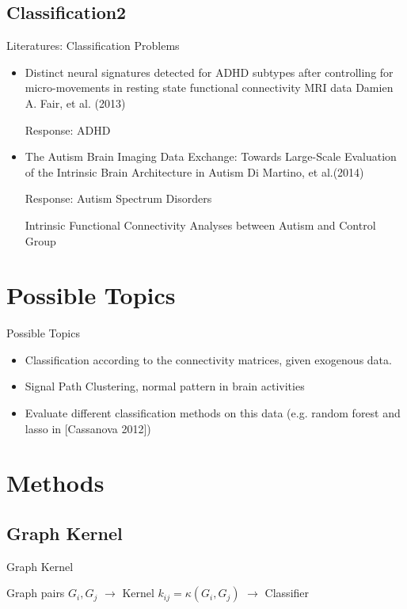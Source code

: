 \documentclass[bigger]{beamer}
\begin{document}
\subsection{Classification2}
\begin{frame}[label=sec-3-2-2]{Literatures: Classification Problems}
\label{sec-3-2-2}
\begin{itemize}
\item Distinct neural signatures detected for ADHD subtypes after controlling for micro-movements in resting state functional connectivity MRI data
Damien A. Fair, et al. (2013)

Response: ADHD

\item The Autism Brain Imaging Data Exchange: Towards Large-Scale Evaluation of the Intrinsic Brain Architecture in Autism 
Di Martino, et al.(2014)

Response: Autism Spectrum Disorders

Intrinsic Functional Connectivity Analyses between Autism and Control Group
\end{itemize}
\end{frame}

\section{Possible Topics}
\begin{frame}[label=sec-4-1-1]{Possible Topics}
	\label{sec-4-1-1}
\begin{itemize}
	\item Classification according to the connectivity matrices, given exogenous data.
	\item Signal Path Clustering, normal pattern in brain activities
	\item Evaluate different classification methods on this data (e.g. random forest and lasso in [Cassanova 2012])
\end{itemize}
\end{frame}


\section{Methods}
\subsection{Graph Kernel}
\begin{frame}[label=sec-5-1-1]{Graph Kernel}
	\label{sec-5-1-1}
\begin{center}
	Graph pairs $G_i,G_j$ $\rightarrow$ Kernel $k_{ij}=\kappa(G_i, G_j)$ $\rightarrow$ Classifier 
\end{center}
\end{frame}
\end{document}
